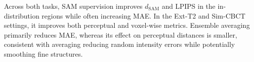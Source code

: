 \documentclass[lettersize,journal]{IEEEtran}
\begin{document}
Across both tasks, SAM supervision improves $d_{\mathrm{SAM}}$ and LPIPS in the in-distribution regions while often increasing MAE. In the Ext-T2 and Sim-CBCT settings, it improves both perceptual and voxel-wise metrics. Ensemble averaging primarily reduces MAE, whereas its effect on perceptual distances is smaller, consistent with averaging reducing random intensity errors while potentially smoothing fine structures.
\end{document}
